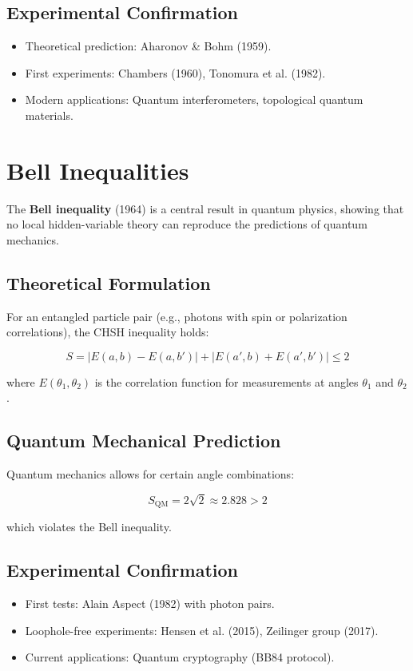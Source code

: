 \subsection{Experimental Confirmation}
\begin{itemize}
\item Theoretical prediction: Aharonov \& Bohm (1959).
\item First experiments: Chambers (1960), Tonomura et al. (1982).
\item Modern applications: Quantum interferometers, topological quantum materials.
\end{itemize}

\section{Bell Inequalities}
\label{sec:bell}

The \textbf{Bell inequality} (1964) is a central result in quantum physics, showing that no local hidden-variable theory can reproduce the predictions of quantum mechanics.

\subsection{Theoretical Formulation}
For an entangled particle pair (e.g., photons with spin or polarization correlations), the CHSH inequality holds:

\begin{equation}
S = |E(a,b) - E(a,b')| + |E(a',b) + E(a',b')| \leq 2
\end{equation}

where $E(\theta_1, \theta_2)$ is the correlation function for measurements at angles $\theta_1$ and $\theta_2$.

\subsection{Quantum Mechanical Prediction}
Quantum mechanics allows for certain angle combinations:

\begin{equation}
S_{\text{QM}} = 2\sqrt{2} \approx 2.828 > 2
\end{equation}

which violates the Bell inequality.

\subsection{Experimental Confirmation}
\begin{itemize}
\item First tests: Alain Aspect (1982) with photon pairs.
\item Loophole-free experiments: Hensen et al. (2015), Zeilinger group (2017).
\item Current applications: Quantum cryptography (BB84 protocol).
\end{itemize}


